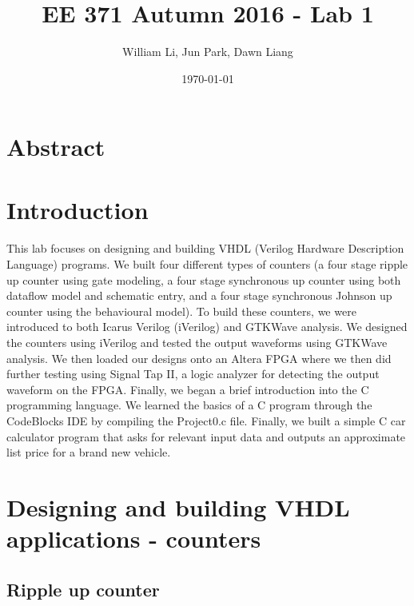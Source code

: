 \documentclass{article}
\title{EE 371 Autumn 2016 - Lab 1}
\date{\today}
\author{William Li, Jun Park, Dawn Liang}
\begin{document}
\maketitle
\newpage
{}

\section{Abstract}

\section{Introduction}

\paragraph{}
This lab focuses on designing and building VHDL (Verilog Hardware Description Language) programs. We built four different types of counters (a four stage ripple up counter using gate modeling, a four stage synchronous up counter using both dataflow model and schematic entry,   and a four stage synchronous Johnson up counter using the behavioural model). To build these counters, we were introduced to both Icarus Verilog (iVerilog) and GTKWave analysis. We designed the counters using iVerilog and tested the output waveforms using GTKWave analysis. We then loaded our designs onto an Altera FPGA where we then did further testing using Signal Tap II, a logic analyzer for detecting the output waveform on the FPGA. Finally, we began a brief introduction into the C programming language. We learned the basics of a C program through the CodeBlocks IDE by compiling the Project0.c file. Finally, we built a simple C car calculator program that asks for relevant input data and outputs an approximate list price for a brand new vehicle. 

\section{Designing and building VHDL applications - counters}



\subsection{Ripple up counter}


\end{document}
